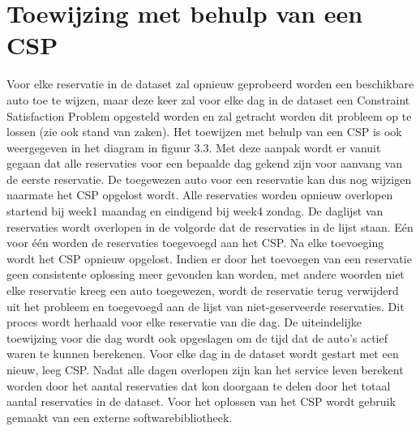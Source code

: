 \section{Toewijzing met behulp van een CSP}
Voor elke reservatie in de dataset zal opnieuw geprobeerd worden een beschikbare auto toe te wijzen, maar deze keer zal voor elke dag in de dataset een Constraint Satisfaction Problem opgesteld worden en zal getracht worden dit probleem op te lossen (zie ook stand van zaken). Het toewijzen met behulp van een CSP is ook weergegeven in het diagram in figuur 3.3. Met deze aanpak wordt er vanuit gegaan dat alle reservaties voor een bepaalde dag gekend zijn voor aanvang van de eerste reservatie. De toegewezen auto voor een reservatie kan dus nog wijzigen naarmate het CSP opgelost wordt. Alle reservaties worden opnieuw overlopen startend bij week1 maandag en eindigend bij week4 zondag. De daglijst van reservaties wordt overlopen in de volgorde dat de reservaties in de lijst staan. Eén voor één worden de reservaties toegevoegd aan het CSP. Na elke toevoeging wordt het CSP opnieuw opgelost. Indien er door het toevoegen van een reservatie geen consistente oplossing meer gevonden kan worden, met andere woorden niet elke reservatie kreeg een auto toegewezen, wordt de reservatie terug verwijderd uit het probleem en toegevoegd aan de lijst van niet-geserveerde reservaties. Dit proces wordt herhaald voor elke reservatie van die dag. De uiteindelijke toewijzing voor die dag wordt ook opgeslagen om de tijd dat de auto's actief waren te kunnen berekenen. Voor elke dag in de dataset wordt gestart met een nieuw, leeg CSP. Nadat alle dagen overlopen zijn kan het service leven berekent worden door het aantal reservaties dat kon doorgaan te delen door het totaal aantal reservaties in de dataset. Voor het oplossen van het CSP wordt gebruik gemaakt van een externe softwarebibliotheek.





